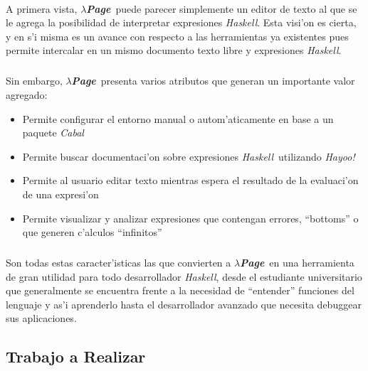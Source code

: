 \documentclass[a4paper]{article}
\newcommand{\haskell}{\textsl{Haskell}}
\newcommand{\hpage}{\textbf{\textsl{$\lambda$Page}}}
\newcommand{\cabal}{\textsl{Cabal}}
\begin{document}
\paragraph{}A primera vista, \hpage\ puede parecer simplemente un editor de texto al que se le agrega la posibilidad de interpretar expresiones \haskell.  Esta visi'on es cierta, y en s'i misma es un avance con respecto a las herramientas ya existentes pues permite intercalar en un mismo documento texto libre y expresiones \haskell.
\subparagraph{}Sin embargo, \hpage\ presenta varios atributos que generan un importante valor agregado:
\begin{itemize}
	\item Permite configurar el entorno manual o autom'aticamente en base a un paquete \cabal
	\item Permite buscar documentaci'on sobre expresiones \haskell\ utilizando \textsl{Hayoo!}
	\item Permite al usuario editar texto mientras espera el resultado de la evaluaci'on de una expresi'on
	\item Permite visualizar y analizar expresiones que contengan errores, ``bottoms'' o que generen c'alculos ``infinitos''
\end{itemize}
\subparagraph{}Son todas estas caracter'isticas las que convierten a \hpage\ en una herramienta de gran utilidad para todo desarrollador \haskell, desde el estudiante universitario que generalmente se encuentra frente a la necesidad de ``entender''  funciones del lenguaje y as'i aprenderlo hasta el desarrollador avanzado que necesita debuggear sus aplicaciones.

\newpage
\subsection{Trabajo a Realizar}
\begin{epigraphs}
\end{epigraphs}
\end{document}
